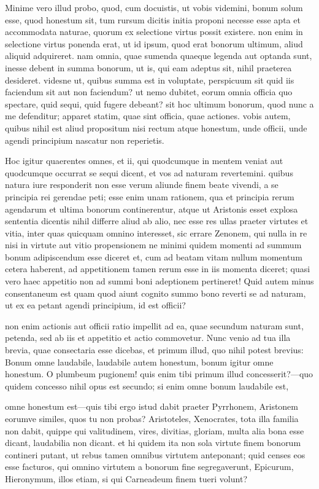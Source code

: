  Minime vero illud probo, quod, cum docuistis, ut vobis videmini, bonum solum esse, quod honestum sit, tum rursum dicitis initia proponi necesse esse apta et accommodata naturae, quorum ex selectione virtus possit existere. non enim in selectione virtus ponenda erat, ut id ipsum, quod erat bonorum ultimum, aliud aliquid adquireret. nam omnia, quae sumenda quaeque legenda aut optanda sunt, inesse debent in summa bonorum, ut is, qui eam adeptus sit, nihil praeterea desideret. videsne ut, quibus summa est in voluptate, perspicuum sit quid iis faciendum sit aut non faciendum? ut nemo dubitet, eorum omnia officia quo spectare, quid sequi, quid fugere debeant? sit hoc ultimum bonorum, quod nunc a me defenditur; apparet statim, quae sint officia, quae actiones. vobis autem, quibus nihil est aliud propositum nisi rectum atque honestum, unde officii, unde agendi principium nascatur non reperietis.

 Hoc igitur quaerentes omnes, et ii, qui quodcumque in mentem veniat aut quodcumque occurrat se sequi dicent, et vos ad naturam revertemini. quibus natura iure responderit non esse verum aliunde finem beate vivendi, a se principia rei gerendae peti; esse enim unam rationem, qua et principia rerum agendarum et ultima bonorum continerentur, atque ut Aristonis esset explosa sententia dicentis nihil differre aliud ab alio, nec esse res ullas praeter virtutes et vitia, inter quas quicquam omnino interesset, sic errare Zenonem, qui nulla in re nisi in virtute aut vitio propensionem ne minimi quidem momenti ad summum bonum adipiscendum esse diceret et, cum ad beatam vitam nullum momentum cetera haberent, ad appetitionem tamen rerum esse in iis momenta diceret; quasi vero haec appetitio non ad summi boni adeptionem pertineret! Quid autem minus consentaneum est quam quod aiunt cognito summo bono reverti se ad naturam, ut ex ea petant agendi principium, id est officii?

 non enim actionis aut officii ratio impellit ad ea, quae secundum naturam sunt, petenda, sed ab iis et appetitio et actio commovetur. Nunc venio ad tua illa brevia, quae consectaria esse dicebas, et primum illud, quo nihil potest brevius: Bonum omne laudabile, laudabile autem honestum, bonum igitur omne honestum. O plumbeum pugionem! quis enim tibi primum illud concesserit?—quo quidem concesso nihil opus est secundo; si enim omne bonum laudabile est,

 omne honestum est—quis tibi ergo istud dabit praeter Pyrrhonem, Aristonem eorumve similes, quos tu non probas? Aristoteles, Xenocrates, tota illa familia non dabit, quippe qui valitudinem, vires, divitias, gloriam, multa alia bona esse dicant, laudabilia non dicant. et hi quidem ita non sola virtute finem bonorum contineri putant, ut rebus tamen omnibus virtutem anteponant; quid censes eos esse facturos, qui omnino virtutem a bonorum fine segregaverunt, Epicurum, Hieronymum, illos etiam, si qui Carneadeum finem tueri volunt?


